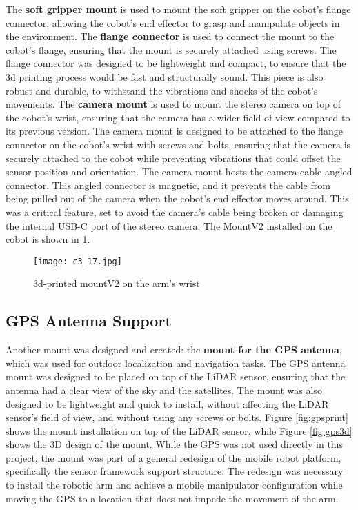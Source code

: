 The \textbf{soft gripper mount} is used to mount the soft gripper on the cobot's flange connector, allowing the cobot's
end effector to grasp and manipulate objects in the environment.
The \textbf{flange connector} is used to connect the mount to the cobot's flange, ensuring that the mount is securely 
attached using screws. The flange connector was designed to be lightweight and compact, 
to ensure that the 3d printing process would be fast and structurally sound. This piece is also
robust and durable, to withstand the vibrations and shocks of the cobot's movements.
The \textbf{camera mount} is used to mount the stereo camera on top of the cobot's wrist,
ensuring that the camera has a wider field of view compared to its previous version.
The camera mount is designed to be attached to the flange connector on the cobot's wrist with screws and bolts,
ensuring that the camera is securely attached to the cobot while preventing vibrations that could
offset the sensor position and orientation. The camera mount hosts the camera cable angled connector.
This angled connector is magnetic, and it prevents the cable from being pulled out of the camera when
the cobot's end effector moves around. This was a critical feature, set to avoid the camera's cable
being broken or damaging the internal USB-C port of the stereo camera. The MountV2 installed on the cobot
is shown in \ref{fig:c3_img17}.

\begin{figure}[t]
    \centering
    \texttt{[image: c3\_17.jpg]}
    \captionsetup{width=1\linewidth}
    \caption{3d-printed mountV2 on the arm's wrist}
    \label{fig:c3_img17}
\end{figure}

\subsection{GPS Antenna Support}

Another mount was designed and created: the \textbf{mount for the GPS antenna}, which was used for outdoor localization
and navigation tasks. The GPS antenna mount was designed to be placed on top of the LiDAR sensor, ensuring
that the antenna had a clear view of the sky and the satellites. The mount was also designed to be lightweight
and quick to install, without affecting the LiDAR sensor's field of view, and without using any screws or bolts.
Figure \ref{fig:gpsprint} shows the mount installation on top of the LiDAR sensor, while Figure \ref{fig:gps3d}
shows the 3D design of the mount.
While the GPS was not used directly in this project, the mount was part of a general redesign of the mobile robot platform,
specifically the sensor framework support structure. The redesign was necessary to install the robotic arm and achieve
a mobile manipulator configuration while moving the GPS to a location that does not impede the movement of the arm.

